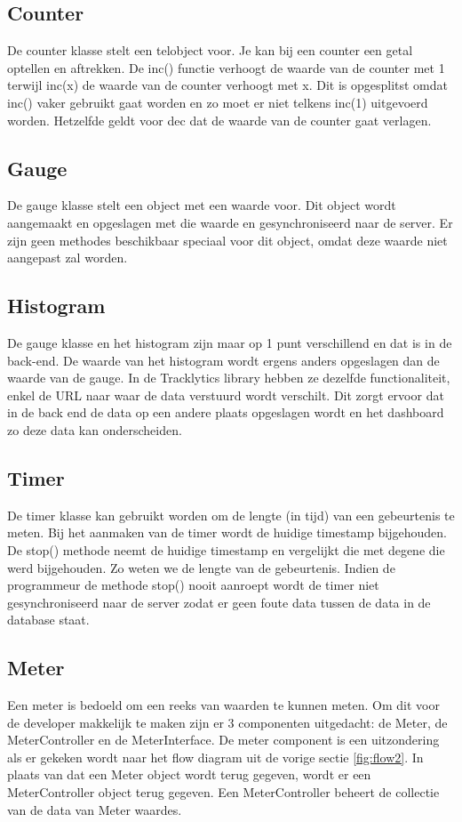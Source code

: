 \subsection{Counter}
De counter klasse stelt een telobject voor. Je kan bij een counter een getal optellen en aftrekken. De inc() functie verhoogt de waarde van de counter met 1 terwijl inc(x) de waarde van de counter verhoogt met x. Dit is opgesplitst omdat inc() vaker gebruikt gaat worden en zo moet er niet telkens inc(1) uitgevoerd worden. Hetzelfde geldt voor dec dat de waarde van de counter gaat verlagen. 

\subsection{Gauge}
De gauge klasse stelt een object met een waarde voor. Dit object wordt aangemaakt en opgeslagen met die waarde en gesynchroniseerd naar de server. Er zijn geen methodes beschikbaar speciaal voor dit object, omdat deze waarde niet aangepast zal worden.

\subsection{Histogram}
De gauge klasse en het histogram zijn maar op 1 punt verschillend en dat is in de back-end. De waarde van het histogram wordt ergens anders opgeslagen dan de waarde van de gauge. In de Tracklytics library hebben ze dezelfde functionaliteit, enkel de URL naar waar de data verstuurd wordt verschilt. Dit zorgt ervoor dat in de back end de data op een andere plaats opgeslagen wordt en het dashboard zo deze data kan onderscheiden.

\subsection{Timer}
De timer klasse kan gebruikt worden om de lengte (in tijd) van een gebeurtenis te meten. Bij het aanmaken van de timer wordt de huidige timestamp bijgehouden. De stop() methode neemt de huidige timestamp en vergelijkt die met degene die werd bijgehouden. Zo weten we de lengte van de gebeurtenis. Indien de programmeur de methode stop() nooit aanroept wordt de timer niet gesynchroniseerd naar de server zodat er geen foute data tussen de data in de database staat. 

\subsection{Meter}
Een meter is bedoeld om een reeks van waarden te kunnen meten. Om dit voor de developer makkelijk te maken zijn er  3 componenten uitgedacht: de Meter, de MeterController en de MeterInterface. De meter component is een uitzondering als er gekeken wordt naar het flow diagram uit de vorige sectie \ref{fig:flow2}. In plaats van dat een Meter object wordt terug gegeven, wordt er een MeterController object terug gegeven. Een MeterController beheert de collectie van de data van Meter waardes. 

